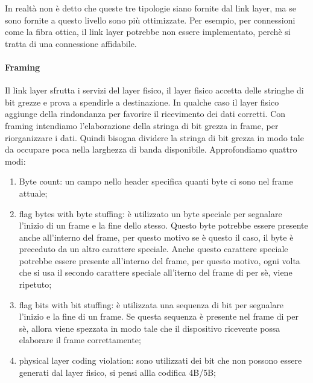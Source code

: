 \documentclass{article}
\begin{document}
In realtà non è detto che queste tre tipologie siano fornite dal link layer, ma
se sono fornite a questo livello sono più ottimizzate. Per esempio, per
connessioni come la fibra ottica, il link layer potrebbe non essere
implementato, perchè si tratta di una connessione affidabile.

\paragraph{Framing}
Il link layer sfrutta i servizi del layer fisico, il layer fisico accetta delle
stringhe di bit grezze e prova a spendirle a destinazione. In qualche caso il
layer fisico aggiunge della rindondanza per favorire il ricevimento dei dati
corretti. Con framing intendiamo l'elaborazione della stringa di bit grezza in
frame, per riorganizzare i dati. Quindi bisogna dividere la stringa di bit
grezza in modo tale da occupare poca nella larghezza di banda disponibile.
Approfondiamo quattro modi:
\begin{enumerate}
	\item Byte count: un campo nello header specifica quanti byte ci sono nel
	      frame attuale;

	\item flag bytes with byte stuffing: è utilizzato un byte speciale per
	      segnalare l'inizio di un frame e la fine dello stesso. Questo byte
	      potrebbe essere presente anche all'interno del frame, per questo motivo
	      se è questo il caso, il byte è preceduto da un altro carattere speciale.
	      Anche questo carattere speciale potrebbe essere presente all'interno del
	      frame, per questo motivo, ogni volta che si usa il secondo carattere
	      speciale all'iterno del frame di per sè, viene ripetuto;

	\item flag bits with bit stuffing: è utilizzata una sequenza di bit per
	      segnalare l'inizio e la fine di un frame. Se questa sequenza è presente
	      nel frame di per sè, allora viene spezzata in modo tale che il
	      dispositivo ricevente possa elaborare il frame correttamente;

	\item physical layer coding violation: sono utilizzati dei bit che non
	      possono essere generati dal layer fisico, si pensi allla codifica 4B/5B;
\end{enumerate}
\end{document}
